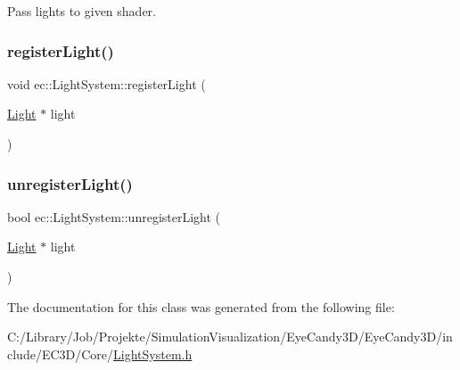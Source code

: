 Pass lights to given shader. \mbox{\label{classec_1_1_light_system_aedb1b50a5920e42732e53f8eb8a5410d}} 
\subsubsection{\texorpdfstring{register\+Light()}{registerLight()}}
{\footnotesize\ttfamily void ec\+::\+Light\+System\+::register\+Light (\begin{DoxyParamCaption}\item[{\mbox{\hyperlink{classec_1_1_light}{Light}} $\ast$}]{light }\end{DoxyParamCaption})}

\mbox{\label{classec_1_1_light_system_ab1bd930134d6305a5666a165fc41d0f5}} 
\subsubsection{\texorpdfstring{unregister\+Light()}{unregisterLight()}}
{\footnotesize\ttfamily bool ec\+::\+Light\+System\+::unregister\+Light (\begin{DoxyParamCaption}\item[{\mbox{\hyperlink{classec_1_1_light}{Light}} $\ast$}]{light }\end{DoxyParamCaption})}



The documentation for this class was generated from the following file\+:\begin{DoxyCompactItemize}
\item 
C\+:/\+Library/\+Job/\+Projekte/\+Simulation\+Visualization/\+Eye\+Candy3\+D/\+Eye\+Candy3\+D/include/\+E\+C3\+D/\+Core/\mbox{\hyperlink{_light_system_8h}{Light\+System.\+h}}\end{DoxyCompactItemize}
